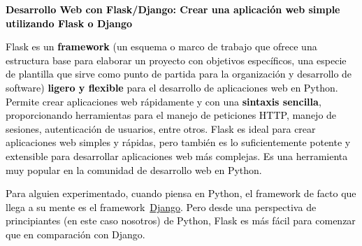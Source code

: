 \documentclass[a4paper]{article}
\newcommand\textstyleInternetlink[1]{\textcolor{blue}{#1}}
\begin{document}
\begin{center}
\end{center}

\begin{center}
\end{center}

\begin{center}
\end{center}
\clearpage
{
\textbf{\textcolor{black}{Desarrollo Web con Flask/Django: Crear una aplicación web simple utilizando Flask o Django}}}


\bigskip

{
\textcolor{black}{Flask es un }\textbf{\textcolor{black}{framework}}\textcolor{black}{ (un esquema o marco de trabajo
que ofrece una estructura base para elaborar un proyecto con objetivos específicos, una especie de plantilla que sirve
como punto de partida para la organización y desarrollo de software) }\textbf{\textcolor{black}{ligero y
flexible}}\textcolor{black}{ para el desarrollo de aplicaciones web en Python. Permite crear aplicaciones web
rápidamente y con una }\textbf{\textcolor{black}{sintaxis sencilla}}\textcolor{black}{, proporcionando herramientas
para el manejo de peticiones HTTP, manejo de sesiones, autenticación de usuarios, entre otros. Flask es ideal para
crear aplicaciones web simples y rápidas, pero también es lo suficientemente potente y extensible para desarrollar
aplicaciones web más complejas. Es una herramienta muy popular en la comunidad de desarrollo web en Python.}}

{
\textcolor{black}{Para alguien experimentado, cuando piensa en Python, el framework de facto que llega a su mente es el
framework }\href{https://www.djangoproject.com/}{\textstyleInternetlink{\textcolor{black}{Django}}}\textcolor{black}{.
Pero desde una perspectiva de principiantes (en este caso nosotros) de Python, Flask es más fácil para comenzar que en
comparación con Django.}}
\end{document}
